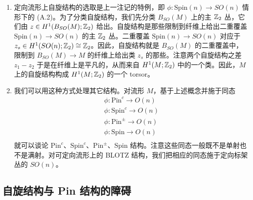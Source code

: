 \begin{enumerate}[label=\arabic*., leftmargin=2.1em]
\item 定向流形上自旋结构的选取是上一注记的特例，即 $\phi:\mathrm{Spin}(n)\to SO(n)$ 情形下的 (A.2)。为了分类自旋结构，我们先分类 $B_{SO}(M)$ 上的主 $\mathbb{Z}_{2}$ 丛，它们由 $z\in H^{1}(B_{SO}(M);\mathbb{Z}_{2})$ 给出。自旋结构是那些限制到纤维上给出二重覆盖 $\mathrm{Spin}(n)\to SO(n)$ 的主 $\mathbb{Z}_{2}$ 丛。二重覆盖 $\mathrm{Spin}(n)\to SO(n)$ 对应于 $z_{s}\in H^{1}(SO(n);\mathbb{Z}_{2})\cong\mathbb{Z}_{2}$。因此，自旋结构就是 $B_{SO}(M)$ 的二重覆盖中，限制到 $B_{SO}(M)\to M$ 的纤维上给出类 $z_{s}$ 的那些。注意两个自旋结构之差 $z_{1}-z_{2}$ 于是在纤维上是平凡的，从而来自 $H^{1}(M;\mathbb{Z}_{2})$ 中的一个类。因此，$M$ 上的自旋结构构成 $H^{1}(M;\mathbb{Z}_{2})$ 的一个 torsor。

\item 我们可以用这种方式处理其它结构。对流形 $M$，基于上述概念并施于同态
\begin{gather}
\phi:\mathrm{Pin}^{c}\to O(n) \tag{A.5}\\
\phi:\mathrm{Spin}^{c}\to O(n) \tag{A.6}\\
\phi:\mathrm{Pin}^{\pm}\to O(n) \tag{A.7}\\
\phi:\mathrm{Spin}\to O(n) \tag{A.8}\\
\quad \tag{A.9}
\end{gather}
就可以谈论 $\mathrm{Pin}^{c}$、$\mathrm{Spin}^{c}$、$\mathrm{Pin}^{\pm}$、$\mathrm{Spin}$ 结构。注意这些同态一般既不是单射也不是满射。对可定向流形上的 BLOTZ 结构，我们把相应的同态施于定向标架丛的 $SO(n)$。
\end{enumerate}



\subsection{自旋结构与 Pin 结构的障碍}

